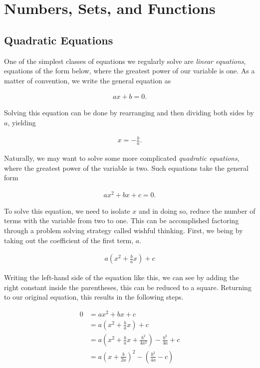\chapter{Numbers, Sets, and Functions}

\section{Quadratic Equations}

One of the simplest classes of equations we regularly solve are \emph{linear equations}, equations of the form below, where the greatest power of our variable is one. As a matter of convention, we write the general equation as

\begin{align}
	ax + b = 0.
\end{align}

Solving this equation can be done by rearranging and then dividing both sides by $a$, yielding

\begin{align*}
	x = -\frac{b}{a}.
\end{align*}

Naturally, we may want to solve some more complicated \emph{quadratic equations}, where the greatest power of the variable is two. Such equations take the general form

\begin{align}
	ax^2 + bx + c = 0.
\end{align}

To solve this equation, we need to isolate $x$ and in doing so, reduce the number of terms with the variable from two to one. This can be accomplished factoring through a problem solving strategy called wishful thinking. First, we being by taking out the coefficient of the first term, $a$.

\begin{align*}
	a \left( x^2 + \frac{b}{a}x \right) + c
\end{align*}

Writing the left-hand side of the equation like this, we can see by adding the right constant inside the parentheses, this can be reduced to a square. Returning to our original equation, this results in the following steps.

\begin{align*}
	0 &= ax^2 + bx + c \\
	&= a \left( x^2 + \frac{b}{a}x \right) + c \\
	&= a \left( x^2 + \frac{b}{a}x + \frac{b^2}{4a^2} \right) - \frac{b^2}{4a} + c \\
	&= a \left( x + \frac{b}{2a} \right)^2 - \left(\frac{b^2}{4a} - c \right)
\end{align*}

